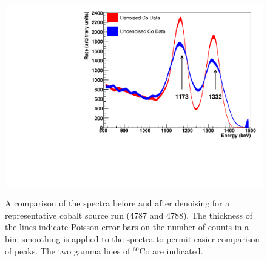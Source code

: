 \begin{figure}
\begin{center}
\includegraphics[keepaspectratio=true,width=\textwidth]{CoSourceSpectrumComparison.pdf}
\end{center}
\renewcommand{\baselinestretch}{1}
\small\normalsize
\begin{quote}
\caption{A comparison of the spectra before and after denoising for a representative cobalt source run (4787 and 4788).  The thickness of the lines indicate Poisson error bars on the number of counts in a bin; smoothing is applied to the spectra to permit easier comparison of peaks.  The two gamma lines of $^{60}$Co are indicated.}
\label{fig:CoSourceSpectrumComparison}
\end{quote}
\end{figure}
\renewcommand{\baselinestretch}{2}
\small\normalsize

